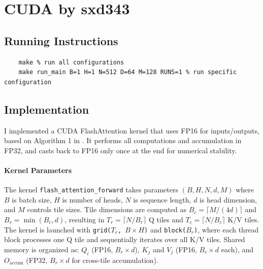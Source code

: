 \documentclass[11pt]{article}
\renewcommand\cite{\citep}  %
\begin{document}

\section{CUDA by sxd343}
\subsection{Running Instructions}
\begin{lstlisting}
    make % run all configurations
    make run_main B=1 H=1 N=512 D=64 M=128 RUNS=1 % run specific configuration
\end{lstlisting}
\subsection{Implementation}
I implemented a CUDA FlashAttention kernel that uses FP16 for inputs/outputs, based on Algorithm 1 in \cite{dao2022flashattention}. It performs all computations and accumulation in FP32, and casts back to FP16 only once at the end for numerical stability. 
\paragraph{Kernel Parameters}
The kernel \texttt{flash\_attention\_forward} takes parameters $(B, H, N, d, M)$ where $B$ is batch size, $H$ is number of heads, $N$ is sequence length, $d$ is head dimension, and $M$ controls tile sizes. Tile dimensions are computed as $B_c = \lceil M/(4d) \rceil$ and $B_r = \min(B_c, d)$, resulting in $T_r = \lceil N/B_r \rceil$ Q tiles and $T_c = \lceil N/B_c \rceil$ K/V tiles. The kernel is launched with \texttt{grid($T_r$, $B \times H$)} and \texttt{block($B_r$)}, where each thread block processes one Q tile and sequentially iterates over all K/V tiles. Shared memory is organized as: $Q_i$ (FP16, $B_r \times d$), $K_j$ and $V_j$ (FP16, $B_c \times d$ each), and $O_{\text{accum}}$ (FP32, $B_r \times d$ for cross-tile accumulation).
\end{document}
